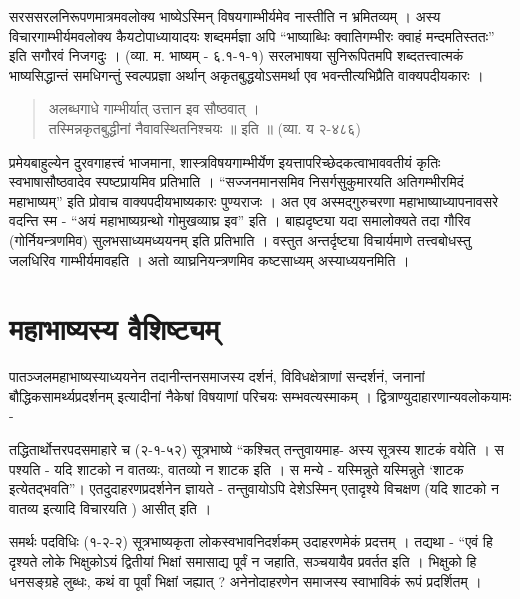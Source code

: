 {सरससरलनिरूपणमात्रमवलोक्य भाष्येऽस्मिन् विषयगाम्भीर्यमेव नास्तीति न भ्रमितव्यम् । अस्य विचारगाम्भीर्यमवलोक्य कैयटोपाध्यायादयः शब्दमर्मज्ञा अपि “भाष्याब्धिः क्वातिगम्भीरः क्वाहं मन्दमतिस्ततः” इति सगौरवं निजगदुः । (व्या. म. भाष्यम् - ६.१-१-१) सरलभाषया सुनिरूपितमपि शब्दतत्त्वात्मकं भाष्यसिद्धान्तं समधिगन्तुं स्वल्पप्रज्ञा अर्थान् अकृतबुद्धयोऽसमर्था एव भवन्तीत्यभिप्रैति वाक्यपदीयकारः ।
\begin{verse}
अलब्धगाधे गाम्भीर्यात् उत्तान इव सौष्ठवात् ।\\
तस्मिन्नकृतबुद्धीनां नैवावस्थितनिश्चयः ॥ इति ॥ (व्या. य २-४८६)
\end{verse}
प्रमेयबाहुल्येन दुरवगाहत्त्वं भाजमाना, शास्त्रविषयगाम्भीर्येण इयत्तापरिच्छेदकत्वाभाववतीयं कृतिः स्वभाषासौष्ठवादेव स्पष्टप्रायमिव प्रतिभाति । “सज्जनमानसमिव निसर्गसुकुमारयति अतिगम्भीरमिदं महाभाष्यम्” इति प्रोवाच वाक्यपदीयभाष्यकारः पुण्यराजः । अत एव अस्मद्गुरुचरणा महाभाष्याध्यापनावसरे वदन्ति स्म - “अयं महाभाष्यग्रन्थो गोमुखव्याघ्र इव” इति । बाह्यदृष्ट्या यदा समालोक्यते तदा गौरिव (गोर्नियन्त्रणमिव) सुलभसाध्यमध्ययनम् इति प्रतिभाति । वस्तुत अन्तर्दृष्ट्या विचार्यमाणे तत्त्वबोधस्तु जलधिरिव गाम्भीर्यमावहति । अतो व्याघ्रनियन्त्रणमिव कष्टसाध्यम् अस्याध्ययनमिति ।

\section*{महाभाष्यस्य वैशिष्ट्यम्} 

पातञ्जलमहाभाष्यस्याध्ययनेन तदानीन्तनसमाजस्य दर्शनं, विविधक्षेत्राणां सन्दर्शनं, जनानां बौद्धिकसामर्थ्यप्रदर्शनम् इत्यादीनां नैकेषां विषयाणां परिचयः सम्भवत्यस्माकम् । द्वित्राण्युदाहारणान्यवलोकयामः -

तद्धितार्थोत्तरपदसमाहारे च (२-१-५२) सूत्रभाष्ये “कश्चित् तन्तुवायमाह- अस्य सूत्रस्य शाटकं वयेति । स पश्यति - यदि शाटको न वातव्यः, वातव्यो न शाटक इति । स मन्ये - यस्मिन्नुते यस्मिन्नुते ‘शाटक इत्येतद्भवति”। एतदुदाहरणप्रदर्शनेन ज्ञायते - तन्तुवायोऽपि देशेऽस्मिन् एतादृश्ये विचक्षण (यदि शाटको न वातव्य इत्यादि विचारयति ) आसीत् इति ।

समर्थः पदविधिः (१-२-२) सूत्रभाष्यकृता लोकस्वभावनिदर्शकम् उदाहरणमेकं प्रदत्तम् । तद्यथा - “एवं हि दृश्यते लोके भिक्षुकोऽयं द्वितीयां भिक्षां समासाद्य पूर्वं न जहाति, सञ्चयायैव प्रवर्तत इति । भिक्षुको हि धनसङ्ग्रहे लुब्धः, कथं वा पूर्वां भिक्षां जह्यात् ? अनेनोदाहरणेन समाजस्य स्वाभाविकं रूपं प्रदर्शितम् ।

}
